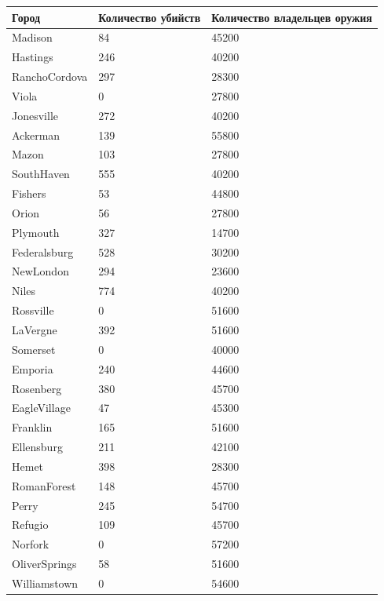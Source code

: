 \documentclass[titlepage]{article}
\begin{document}
\begin{table}[!ht]
    \centering
    \begin{tabular}{|l|l|l|}
    \hline
        Город & Количество убийств & Количество владельцев оружия \\ \hline
        Madison & 84 & 45200 \\ \hline
        Hastings & 246 & 40200 \\ \hline
        RanchoCordova & 297 & 28300 \\ \hline
        Viola & 0 & 27800 \\ \hline
        Jonesville & 272 & 40200 \\ \hline
        Ackerman & 139 & 55800 \\ \hline
        Mazon & 103 & 27800 \\ \hline
        SouthHaven & 555 & 40200 \\ \hline
        Fishers & 53 & 44800 \\ \hline
        Orion & 56 & 27800 \\ \hline
        Plymouth & 327 & 14700 \\ \hline
        Federalsburg & 528 & 30200 \\ \hline
        NewLondon & 294 & 23600 \\ \hline
        Niles & 774 & 40200 \\ \hline
        Rossville & 0 & 51600 \\ \hline
        LaVergne & 392 & 51600 \\ \hline
        Somerset & 0 & 40000 \\ \hline
        Emporia & 240 & 44600 \\ \hline
        Rosenberg & 380 & 45700 \\ \hline
        EagleVillage & 47 & 45300 \\ \hline
        Franklin & 165 & 51600 \\ \hline
        Ellensburg & 211 & 42100 \\ \hline
        Hemet & 398 & 28300 \\ \hline
        RomanForest & 148 & 45700 \\ \hline
        Perry & 245 & 54700 \\ \hline
        Refugio & 109 & 45700 \\ \hline
        Norfork & 0 & 57200 \\ \hline
        OliverSprings & 58 & 51600 \\ \hline
        Williamstown & 0 & 54600 \\ \hline

\end{tabular}
\end{table}
\end{document}
